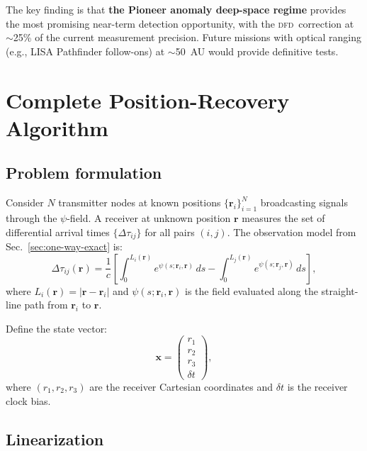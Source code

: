 \documentclass[aps,prd,twocolumn,superscriptaddress,nofootinbib,longbibliography]{revtex4-2}
\newcommand{\DFD}{\textsc{dfd}}
\begin{document}
The key finding is that \textbf{the Pioneer anomaly deep-space regime}
provides the most promising near-term detection opportunity, with the
\DFD\ correction at $\sim$25\% of the current measurement precision.
Future missions with optical ranging (e.g., LISA Pathfinder follow-ons)
at $\sim$50~AU would provide definitive tests.


\section{Complete Position-Recovery Algorithm}\label{sec:position-algo}

\subsection{Problem formulation}\label{sec:pos-formulation}

Consider $N$ transmitter nodes at known positions $\{\mathbf{r}_i\}_{i=1}^N$
broadcasting signals through the $\psi$-field. A receiver at unknown
position $\mathbf{r}$ measures the set of differential arrival times
$\{\Delta\tau_{ij}\}$ for all pairs $(i,j)$. The observation model from
Sec.~\ref{sec:one-way-exact} is:
\begin{equation}\label{eq:obs-model}
\Delta\tau_{ij}(\mathbf{r}) = \frac{1}{c}\left[
\int_0^{L_i(\mathbf{r})} e^{\psi(s;\mathbf{r}_i,\mathbf{r})}\,ds
- \int_0^{L_j(\mathbf{r})} e^{\psi(s;\mathbf{r}_j,\mathbf{r})}\,ds
\right],
\end{equation}
where $L_i(\mathbf{r}) = |\mathbf{r} - \mathbf{r}_i|$ and
$\psi(s;\mathbf{r}_i,\mathbf{r})$ is the field evaluated along the
straight-line path from $\mathbf{r}_i$ to $\mathbf{r}$.

Define the state vector:
\begin{equation}\label{eq:state-vector}
\mathbf{x} = \begin{pmatrix} r_1 \\ r_2 \\ r_3 \\ \delta t \end{pmatrix},
\end{equation}
where $(r_1, r_2, r_3)$ are the receiver Cartesian coordinates and
$\delta t$ is the receiver clock bias.

\subsection{Linearization}\label{sec:linearize}
\end{document}
